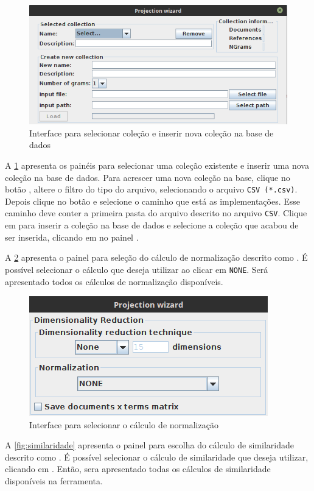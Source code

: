		\begin{figure}[b]
			\centering
			\includegraphics[width=0.8\linewidth]{imagem/createDatabase}
			\caption{Interface para selecionar coleção e inserir nova coleção na base de dados}
			\label{fig:createDatabase}
		\end{figure}
		
		A \cref{fig:createDatabase} apresenta os painéis para selecionar uma coleção existente
		e inserir uma nova coleção na base de dados. Para acrescer uma nova coleção na base,
		clique no botão , altere o filtro do tipo do arquivo, selecionando
		o arquivo \texttt{CSV (*.csv)}. Depois clique no botão  e selecione
		o caminho que está as implementações. Esse caminho deve conter a primeira pasta do
		arquivo descrito no arquivo \texttt{CSV}. Clique em  para inserir a
		coleção na base de dados e selecione a coleção que acabou de ser inserida, clicando
		em  no painel .
		
		A \cref{fig:normalizacao} apresenta o painel para seleção do cálculo de normalização
		descrito como . É possível selecionar o cálculo que deseja
		utilizar ao clicar em \texttt{NONE}. Será apresentado todos os cálculos de
		normalização disponíveis.
		
		\begin{figure}
			\centering
			\includegraphics[width=0.5\linewidth]{imagem/normalizacao}
			\caption{Interface para selecionar o cálculo de normalização}
			\label{fig:normalizacao}
		\end{figure}
		
		A \cref{fig:similaridade} apresenta o painel para escolha do cálculo de similaridade
		descrito como . É possível selecionar o cálculo de
		similaridade que deseja utilizar, clicando em . Então, sera
		apresentado todas os cálculos de similaridade disponíveis na ferramenta.
		
